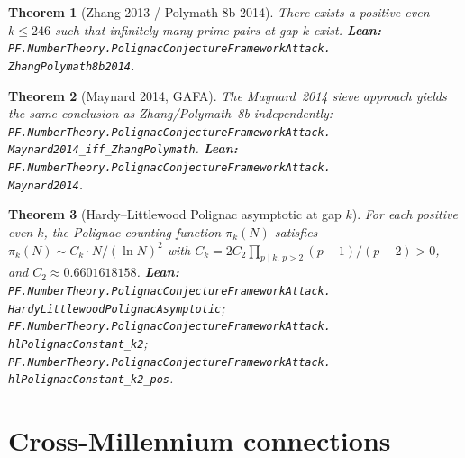 \documentclass[11pt,a4paper]{article}
\theoremstyle{plain}
\newtheorem{theorem}{Theorem}[section]
\theoremstyle{definition}
\begin{document}
\begin{theorem}[Zhang 2013 / Polymath 8b 2014]
\label{thm:zhang}
There exists a positive even $k \le 246$ such that infinitely many
prime pairs at gap $k$ exist.
\textbf{Lean:}
\texttt{PF.NumberTheory.PolignacConjectureFrameworkAttack.\\
ZhangPolymath8b2014}.
\end{theorem}

\begin{theorem}[Maynard 2014, GAFA]
\label{thm:maynard}
The Maynard~2014 sieve approach yields the same conclusion as
Zhang/Polymath~8b independently:
\texttt{PF.NumberTheory.PolignacConjectureFrameworkAttack.\\
Maynard2014\_iff\_ZhangPolymath}.
\textbf{Lean:}
\texttt{PF.NumberTheory.PolignacConjectureFrameworkAttack.\\
Maynard2014}.
\end{theorem}

\begin{theorem}[Hardy--Littlewood Polignac asymptotic at gap $k$]
\label{thm:hl-p}
For each positive even $k$, the Polignac counting function
$\pi_{k}(N)$ satisfies $\pi_{k}(N) \sim C_{k} \cdot N / (\ln N)^{2}$
with $C_{k} = 2 C_{2} \prod_{p \mid k,\, p > 2} (p-1)/(p-2) > 0$, and
$C_{2} \approx 0.6601618158$.
\textbf{Lean:}
\texttt{PF.NumberTheory.PolignacConjectureFrameworkAttack.\\
HardyLittlewoodPolignacAsymptotic};
\texttt{PF.NumberTheory.PolignacConjectureFrameworkAttack.\\
hlPolignacConstant\_k2};
\texttt{PF.NumberTheory.PolignacConjectureFrameworkAttack.\\
hlPolignacConstant\_k2\_pos}.
\end{theorem}

\section{Cross-Millennium connections}
\label{sec:cross-mill}
\end{document}
